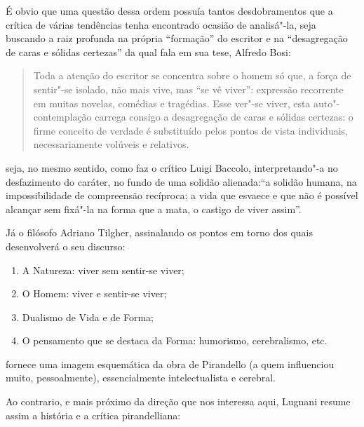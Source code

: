 É obvio que uma questão dessa ordem possuía tantos desdobramentos que a
crítica de várias tendências tenha encontrado ocasião de analisá"-la,
seja buscando a raiz profunda na própria ``formação'' do escritor e na
``desagregação de caras e sólidas certezas'' da qual fala em sua tese,
Alfredo Bosi:

\begin{quote}
Toda a atenção do escritor se concentra sobre o homem só que, a
força de sentir"-se isolado, não mais vive, mas ``se vê viver'':
expressão recorrente em muitas novelas, comédias e tragédias. Esse
ver"-se viver, esta auto"-contemplação carrega consigo a desagregação de
caras e sólidas certezas: o firme conceito de verdade é substituído
pelos pontos de vista individuais, necessariamente volúveis e
relativos.
\end{quote}

seja, no mesmo sentido, como faz o crítico Luigi Baccolo,
interpretando"-a no desfazimento do caráter, no fundo de uma solidão
alienada:``a solidão humana, na impossibilidade de compreensão recíproca; a
vida que esvaece e que não é possível alcançar sem fixá"-la na forma que
a mata, o castigo de viver assim''.

Já o filósofo Adriano Tilgher, assinalando os pontos em torno dos
quais desenvolverá o seu discurso:

\begin{enumerate}
\def\labelenumi{\arabic{enumi}.}
\item
  A Natureza: viver sem sentir-se viver;
\item
  O Homem: viver e sentir-se viver;
\item
  Dualismo de Vida e de Forma;
\item
  O pensamento que se destaca da Forma: humorismo, cerebralismo, etc.
\end{enumerate}

fornece uma imagem esquemática da obra de Pirandello (a quem
influenciou muito, pessoalmente), essencialmente intelectualista e
cerebral.

Ao contrario, e mais próximo da direção que nos interessa aqui, Lugnani resume assim a história e a crítica pirandelliana:

